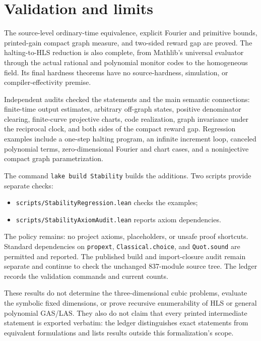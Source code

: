 \documentclass[11pt]{article}
\newcommand{\code}[1]{{\small\nolinkurl{#1}}}
\begin{document}
\section{Validation and limits}

The source-level ordinary-time equivalence, explicit Fourier and primitive
bounds, printed-gain compact graph measure, and two-sided reward gap are
proved. The halting-to-HLS reduction is also complete, from Mathlib's
universal evaluator through the actual rational and polynomial monitor
codes to the homogeneous field. Its final hardness theorems have no
source-hardness, simulation, or compiler-effectivity premise.

Independent audits checked the statements and the main semantic
connections: finite-time output estimates, arbitrary off-graph states,
positive denominator clearing, finite-curve projective charts, code
realization, graph invariance under the reciprocal clock, and both sides
of the compact reward gap. Regression examples include a one-step halting
program, an infinite increment loop, canceled polynomial terms,
zero-dimensional Fourier and chart cases, and a noninjective compact
graph parametrization.

The command \texttt{lake build Stability} builds the additions.
Two scripts provide separate checks:
\begin{itemize}
\item \code{scripts/StabilityRegression.lean} checks the examples;
\item \code{scripts/StabilityAxiomAudit.lean} reports axiom dependencies.
\end{itemize}
The policy remains: no project axioms, placeholders,
or unsafe proof shortcuts. Standard dependencies on \code{propext},
\code{Classical.choice}, and \code{Quot.sound} are permitted and reported.
The published build and import-closure audit remain separate and continue
to check the unchanged 837-module source tree. The ledger records the
validation commands and current counts.

These results do not determine the three-dimensional cubic problems,
evaluate the symbolic fixed dimensions, or prove recursive enumerability
of HLS or general polynomial GAS/LAS. They also do not claim that every
printed intermediate statement is exported verbatim: the ledger
distinguishes exact statements from equivalent formulations and lists
results outside this formalization's scope.
\end{document}
